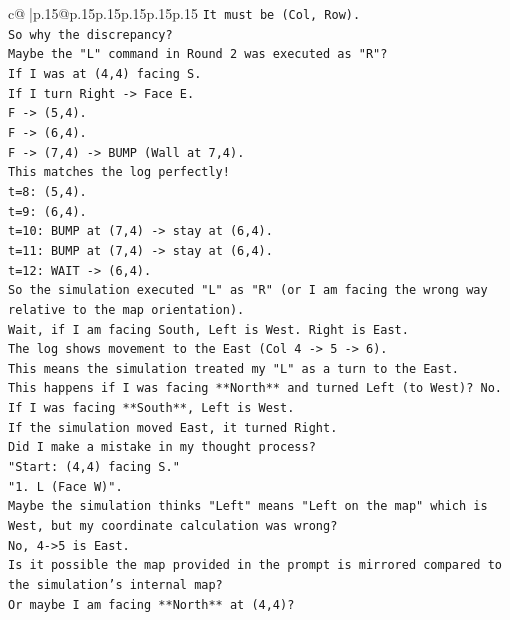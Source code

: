 \documentclass{article}
\begin{document}
{\begin{supertabular}{c@{$\;$}|p{.15\linewidth}@{}p{.15\linewidth}p{.15\linewidth}p{.15\linewidth}p{.15\linewidth}p{.15\linewidth}}
{{{\texttt{It must be (Col, Row).} \\
\texttt{So why the discrepancy?} \\
\texttt{Maybe the "L" command in Round 2 was executed as "R"?} \\
\texttt{If I was at (4,4) facing S.} \\
\texttt{If I turn Right {-}> Face E.} \\
\texttt{F {-}> (5,4).} \\
\texttt{F {-}> (6,4).} \\
\texttt{F {-}> (7,4) {-}> BUMP (Wall at 7,4).} \\
\texttt{This matches the log perfectly!} \\
\texttt{t=8: (5,4).} \\
\texttt{t=9: (6,4).} \\
\texttt{t=10: BUMP at (7,4) {-}> stay at (6,4).} \\
\texttt{t=11: BUMP at (7,4) {-}> stay at (6,4).} \\
\texttt{t=12: WAIT {-}> (6,4).} \\
\texttt{So the simulation executed "L" as "R" (or I am facing the wrong way relative to the map orientation).} \\
\texttt{Wait, if I am facing South, Left is West. Right is East.} \\
\texttt{The log shows movement to the East (Col 4 {-}> 5 {-}> 6).} \\
\texttt{This means the simulation treated my "L" as a turn to the East.} \\
\texttt{This happens if I was facing **North** and turned Left (to West)? No.} \\
\texttt{If I was facing **South**, Left is West.} \\
\texttt{If the simulation moved East, it turned Right.} \\
\texttt{Did I make a mistake in my thought process?} \\
\texttt{"Start: (4,4) facing S."} \\
\texttt{"1. L (Face W)".} \\
\texttt{Maybe the simulation thinks "Left" means "Left on the map" which is West, but my coordinate calculation was wrong?} \\
\texttt{No, 4{-}>5 is East.} \\
\texttt{Is it possible the map provided in the prompt is mirrored compared to the simulation's internal map?} \\
\texttt{Or maybe I am facing **North** at (4,4)?} \\
}}}
\end{supertabular}}
\end{document}
